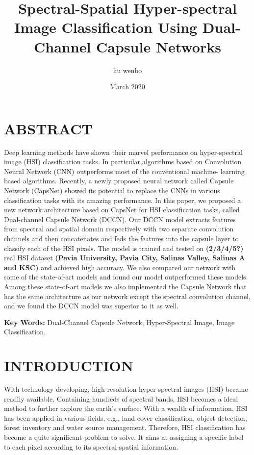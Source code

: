 \documentclass{article}
\title{Spectral-Spatial Hyper-spectral Image Classification Using Dual-Channel Capsule Networks}
\author{liu wenbo}
\date{March 2020}
\begin{document}
	

	\maketitle


	\section{ABSTRACT}\label{sec:abstract}
	Deep learning methods have shown their marvel performance on hyper-spectral image (HSI) classification tasks.
	In particular,algorithms based on Convolution Neural Network (CNN) outperforms most of the conventional machine-
	learning based algorithms.
	Recently, a newly proposed neural network called Capsule Network (CapsNet) showed its potential to replace the CNNs
	in various classification tasks with its amazing performance.
	In this paper, we proposed a new network architecture based on CapsNet for HSI classification tasks, called
	Dual-channel Capsule Network (DCCN).
	Our DCCN model extracts features from spectral and spatial domain respectively with two separate convolution
	channels and then concatenates and feds the features into the capsule layer to classify each of the HSI pixels.
	The model is trained and tested on \textbf{(2/3/4/5?)} real HSI dataset \textbf{(Pavia University, Pavia City,
	Salinas Valley, Salinas A and KSC)} and achieved high accuracy.
	We also compared our network with some of the state-of-art models and found our model outperformed these models.
	Among these state-of-art models we also implemented the Capsule Network that has the same architecture as our
	network except the spectral convolution channel, and we found the DCCN model was superior to it as well.

	\noindent \textbf{Key Words:} Dual-Channel Capsule Network, Hyper-Spectral Image, Image Classification.


	\section{INTRODUCTION}\label{sec:introduction}
	With technology developing, high resolution hyper-spectral images (HSI) became readily available.
	Containing hundreds of spectral bands, HSI becomes a ideal method to further explore the earth's
	surface\cite{du2013foreword,bioucas2013hyperspectral,shippert2003introduction}.
	With a wealth of information, HSI has been applied in various fields, e.g.,
	land cover classification\cite{yan2015urban},
	object detection\cite{eslami2015developing},
	forest inventory\cite{matsuki2015hyperspectral}
	and water source management\cite{govender2007review}.
	Therefore, HSI classification has become a quite significant problem to solve.
	It aims at assigning a specific label to each pixel according to its spectral-spatial information\cite{wang2018scene}.
\end{document}
